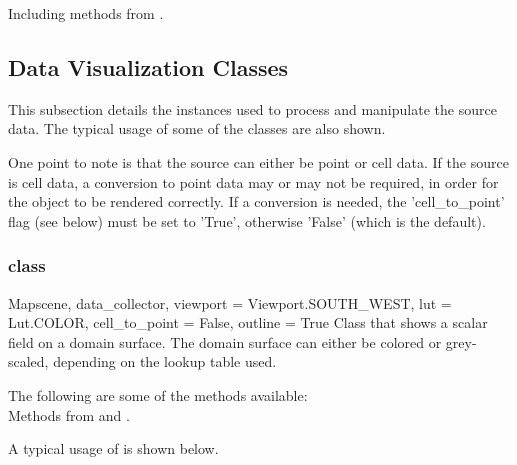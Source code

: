 Including methods from \ActorTwoD. 




\subsection{Data Visualization Classes}
This subsection details the instances used to process and manipulate the source
data. The typical usage of some of the classes are also shown. 

One point to note is that the source can either be point or cell data. If the
source is cell data, a conversion to point data may or may not be
required, in order for the object to be rendered correctly.
If a conversion is needed, the 'cell_to_point' flag (see below) must 
be set to 'True', otherwise 'False' (which is the default).

\subsubsection{\Map class}

\begin{classdesc}{Map}{scene, data_collector, 
viewport = Viewport.SOUTH_WEST, lut = Lut.COLOR, cell_to_point = False,
outline = True}
Class that shows a scalar field on a domain surface. The domain surface 
can either be colored or grey-scaled, depending on the lookup table used.
\end{classdesc}

The following are some of the methods available:\\
Methods from \ActorThreeD and \DataSetMapper.

A typical usage of \Map is shown below.

